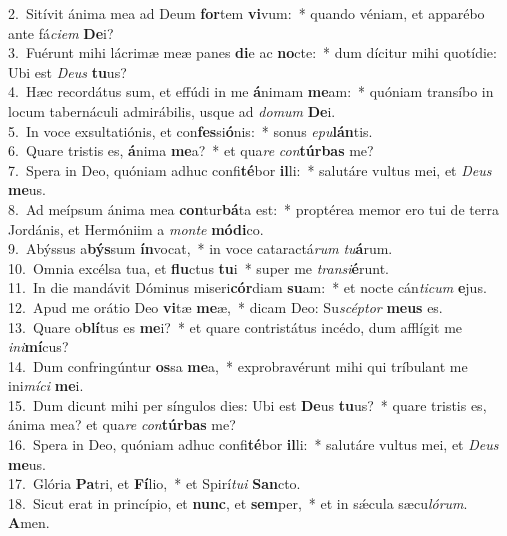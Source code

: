 {2.~}Sitívit ánima mea ad Deum \textbf{for}tem \textbf{vi}vum:~* quando véniam, et apparébo ante fá\textit{ci}\textit{em} \textbf{De}i?\\
{3.~}Fuérunt mihi lácrimæ meæ panes \textbf{di}e ac \textbf{no}cte:~* dum dícitur mihi quotídie: Ubi est \textit{De}\textit{us} \textbf{tu}us?\\
{4.~}Hæc recordátus sum, et effúdi in me \textbf{á}nimam \textbf{me}am:~* quóniam transíbo in locum tabernáculi admirábilis, usque ad \textit{do}\textit{mum} \textbf{De}i.\\
{5.~}In voce exsultatiónis, et con\textbf{fes}si\textbf{ó}nis:~* sonus \textit{e}\textit{pu}\textbf{lán}tis.\\
{6.~}Quare tristis es, \textbf{á}nima \textbf{me}a?~* et qua\textit{re} \textit{con}\textbf{túr}\textbf{bas} me?\\
{7.~}Spera in Deo, quóniam adhuc confi\textbf{té}bor \textbf{il}li:~* salutáre vultus mei, et \textit{De}\textit{us} \textbf{me}us.\\
{8.~}Ad meípsum ánima mea \textbf{con}tur\textbf{bá}ta est:~* proptérea memor ero tui de terra Jordánis, et Hermóniim a \textit{mon}\textit{te} \textbf{mó}\textbf{di}co.\\
{9.~}Abýssus a\textbf{býs}sum \textbf{ín}vocat,~* in voce cataractá\textit{rum} \textit{tu}\textbf{á}rum.\\
{10.~}Omnia excélsa tua, et \textbf{flu}ctus \textbf{tu}i~* super me \textit{tran}\textit{si}\textbf{é}runt.\\
{11.~}In die mandávit Dóminus miseri\textbf{cór}diam \textbf{su}am:~* et nocte cán\textit{ti}\textit{cum} \textbf{e}jus.\\
{12.~}Apud me orátio Deo \textbf{vi}tæ \textbf{me}æ,~* dicam Deo: Su\textit{scép}\textit{tor} \textbf{me}\textbf{us} es.\\
{13.~}Quare o\textbf{blí}tus es \textbf{me}i?~* et quare contristátus incédo, dum afflígit me \textit{i}\textit{ni}\textbf{mí}cus?\\
{14.~}Dum confringúntur \textbf{os}sa \textbf{me}a,~* exprobravérunt mihi qui tríbulant me ini\textit{mí}\textit{ci} \textbf{me}i.\\
{15.~}Dum dicunt mihi per síngulos dies: Ubi est \textbf{De}us \textbf{tu}us?~* quare tristis es, ánima mea? et qua\textit{re} \textit{con}\textbf{túr}\textbf{bas} me?\\
{16.~}Spera in Deo, quóniam adhuc confi\textbf{té}bor \textbf{il}li:~* salutáre vultus mei, et \textit{De}\textit{us} \textbf{me}us.\\
{17.~}Glória \textbf{Pa}tri, et \textbf{Fí}lio,~* et Spirí\textit{tu}\textit{i} \textbf{San}cto.\\
{18.~}Sicut erat in princípio, et \textbf{nunc}, et \textbf{sem}per,~* et in sǽcula sæcu\textit{ló}\textit{rum}. \textbf{A}men.\\
